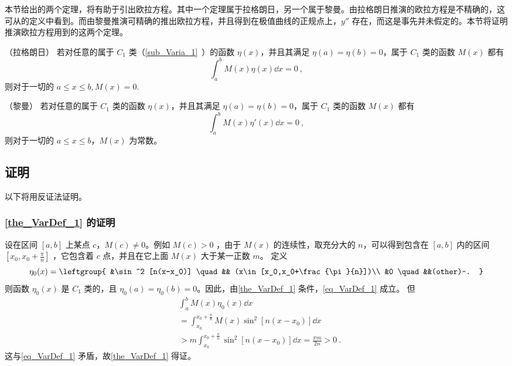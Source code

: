 

本节给出的两个定理，将有助于引出欧拉方程。其中一个定理属于拉格朗日，另一个属于黎曼。由拉格朗日推演的欧拉方程是不精确的，这可从的定义中看到。而由黎曼推演可精确的推出欧拉方程，并且得到在极值曲线的正规点上，$y''$ 存在，而这是事先并未假定的。本节将证明推演欧拉方程用到的这两个定理。

\begin{theorem}{（拉格朗日）}\label{the_VarDef_1}
若对任意的属于 $C_1$ 类（\autoref{sub_Varia_1}~）的函数 $\eta(x)$，并且其满足 $\eta(a)=\eta(b)=0$，属于 $C_1$ 类的函数 $M(x)$ 都有
\begin{equation}\label{eq_VarDef_1}
\int_a^b M(x)\eta(x)\dd x=0~,
\end{equation}
则对于一切的 $a\leq x\leq b,M(x)=0$.
\end{theorem}
\begin{theorem}{（黎曼）}\label{the_VarDef_2}
若对任意的属于 $C_1$ 类的函数 $\eta(x)$，并且其满足 $\eta(a)=\eta(b)=0$，属于 $C_1$ 类的函数 $M(x)$ 都有
\begin{equation}\label{eq_VarDef_2}
\int_a^b M(x)\eta'(x)\dd x=0~,
\end{equation}
则对于一切的 $a\leq x\leq b$，$M(x)$ 为常数。
\end{theorem}
\subsection{证明}
以下将用反证法证明。
\subsubsection{\autoref{the_VarDef_1} 的证明}
设在区间 $[a,b]$  上某点 $c$，$M(c)\neq0$。例如 $M(c)>0$ ，由于 $M(x)$ 的连续性，取充分大的 $n$，可以得到包含在 $[a,b]$ 内的区间 $[x_0,x_0+\frac{\pi}{n}]$ ，它包含着 $c$ 点，并且在它上面 $M(x)$ 大于某一正数 $m$。
定义
\begin{equation}
\eta_0(x)=\leftgroup{
&\sin^2 [n(x-x_0)] \quad && (x\in [x_0,x_0+\frac{\pi}{n}])\\
&0 \quad &&(other)~.
}\end{equation}
则函数 $\eta_0(x)$ 是 $C_1$ 类的，且 $\eta_0(a)=\eta_0(b)=0$。因此，由\autoref{the_VarDef_1} 条件，\autoref{eq_VarDef_1} 成立。
但
\begin{equation}
\begin{aligned}
&\int_a^b M(x)\eta_0(x)\dd x\\
&=\int_{x_0}^{x_0+\frac{\pi}{n}}M(x)\sin^2[n(x-x_0)]\dd x\\
&>m\int_{x_0}^{x_0+\frac{\pi}{n}}\sin^2[n(x-x_0)]\dd x=\frac{\pi m}{2n}>0~.
\end{aligned}
\end{equation}
这与\autoref{eq_VarDef_1} 矛盾，故\autoref{the_VarDef_1} 得证。
